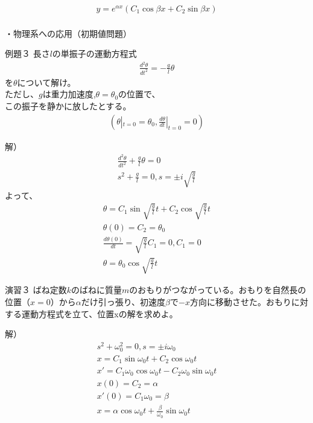 \documentclass{jsarticle}
\begin{document}
\begin{eqnarray}
y=e^{\alpha x}(C_1 \cos \beta x+C_2 \sin \beta x)
\end{eqnarray}
\\
・物理系への応用（初期値問題）
\begin{itembox}[l]{例題３}
長さ$l$の単振子の運動方程式
\begin{eqnarray}
\frac{d^2\theta}{dt^2}=-\frac{g}{l}\theta
\end{eqnarray}
を$\theta$について解け。\\
ただし、$g$は重力加速度,$\theta = \theta_0$の位置で、\\
この振子を静かに放したとする。
\begin{eqnarray}
(\theta|_{t=0}=\theta_0,\frac{d\theta}{dt}|_{t=0}=0)
\end{eqnarray}
\end{itembox}
解）
\begin{eqnarray}
\frac{d^2\theta}{dt^2}+\frac{g}{l}\theta =0 \\
s^2+\frac{g}{l}=0,s=\pm i\sqrt{\frac{g}{l}}
\end{eqnarray}
よって、
\begin{eqnarray}
\theta =C_1\sin \sqrt{\frac{g}{l}}t+C_2\cos \sqrt{\frac{g}{l}}t\\
\theta(0)=C_2=\theta_0\\
\frac{d\theta(0)}{dt}=\sqrt{\frac{g}{l}}C_1=0,C_1=0\\
\theta= \theta_0\cos \sqrt{\frac{g}{l}}t
\end{eqnarray}
\begin{itembox}[l]{演習３}
ばね定数$k$のばねに質量$m$のおもりがつながっている。おもりを自然長の位置（$x=0$）から$\alpha$だけ引っ張り、初速度$\beta$で$-x$方向に移動させた。おもりに対する運動方程式を立て、位置xの解を求めよ。
\end{itembox}
解）
\begin{eqnarray}
s^2+\omega_0^2=0,s=\pm i\omega_0\\
x=C_1\sin \omega_0t+C_2\cos \omega_0t\\
x'=C_1\omega_0\cos \omega_0t-C_2\omega_0\sin \omega_0t\\
x(0)=C_2=\alpha\\
x'(0)=C_1\omega_0=\beta\\
x=\alpha \cos \omega_0t+\frac{\beta}{\omega_0}\sin \omega_0 t
\end{eqnarray}
\clearpage
\end{document}
